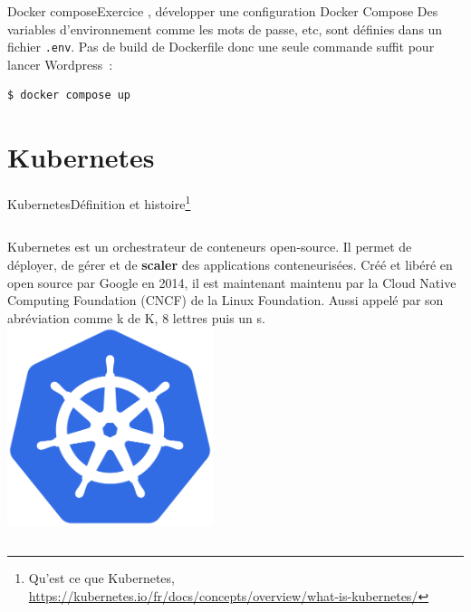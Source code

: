 \documentclass{beamer}
\begin{document}
    \begin{frame}[fragile]{Docker compose}{Exercice \execcounterdispinc{}, développer une configuration Docker Compose}
        Des variables d'environnement comme les mots de passe, etc, sont définies dans un fichier \lstinline{.env}.
        \bigbreak
        Pas de build de Dockerfile donc une seule commande suffit pour lancer Wordpress~:
        \begin{lstlisting}[language=bash]
$ docker compose up
        \end{lstlisting}
    \end{frame}


    \section{Kubernetes}\label{sec:kubernetes}

    \begin{frame}{Kubernetes}{Définition et histoire\footnote{Qu'est ce que Kubernetes, \url{https://kubernetes.io/fr/docs/concepts/overview/what-is-kubernetes/}}}
        \begin{columns}
            Kubernetes est un orchestrateur de conteneurs open-source.
            Il permet de déployer, de gérer et de \textbf{scaler} des applications conteneurisées.
            \bigbreak
            Créé et libéré en open source par Google en 2014, il est maintenant maintenu par la Cloud Native Computing Foundation (CNCF) de la Linux Foundation.
            \bigbreak
            Aussi appelé par son abréviation  comme k de K, 8 lettres puis un s.
            \centering
            \includegraphics[width=6cm]{image/kubernetes-logo}
        \end{columns}
    \end{frame}
\end{document}
